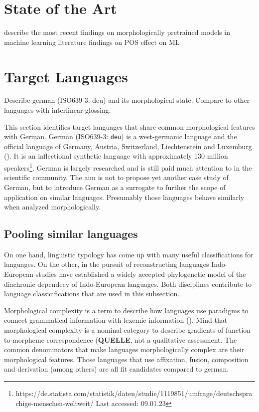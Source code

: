 \section{State of the Art}
\label{sec:state-of-the-art}
describe the most recent findings on morphologically pretrained models in machine learning literature
findings on POS effect on ML


\section{Target Languages}
\label{sec:target-languages}

Describe german (ISO639-3: deu) and its morphological state. Compare to other languages with interlinear glossing.

This section identifies target languages that share common morphological features with German.
German (ISO639-3: \texttt{deu}) is a west-germanic language and the official language of Germany, Austria, Switzerland, Liechtenstein and Luxemburg (\cite{METZLER2016}).
It is an inflectional synthetic language with approximately 130 million speakers\footnote{https://de.statista.com/statistik/daten/studie/1119851/umfrage/deutschsprachige-menschen-weltweit/ Last accessed: 09.01.23}.
German is largely researched and is still paid much attention to in the scientific community.
The aim is not to propose yet another case study of German, but to introduce German as a surrogate to further the scope of application on similar languages.
Presumably those languages behave similarly when analyzed morphologically.

\subsection{Pooling similar languages}
\label{subsec:german-as-example}



On one hand, linguistic typology has come up with many useful classifications for languages.
On the other, in the pursuit of reconstructing languages Indo-European studies have established a widely accepted phylogenetic model of the diachronic dependecy of Indo-European languages.
Both disciplines contribute to language classicifications that are used in this subsection.

Morphological complexity is a term to describe how languages use paradigms to connect grammatical information with lexemic information (\cite{MORPHOLOGICALCOMPLEXITY}).
Mind that morphological complexity is a nominal category to describe gradients of function-to-morpheme correspondence (\textbf{QUELLE}, not a qualitative assessment.
The common denominators that make languages morphologically complex are their morphological features.
Those languages that use affixation, fusion, composition and derivation (among others) are all fit candidates compared to german.

